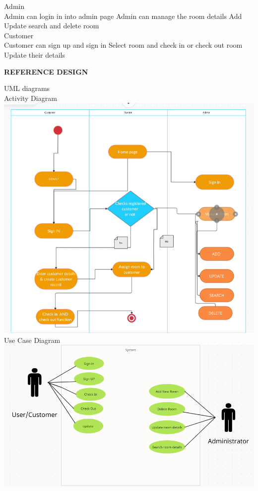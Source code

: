 \documentclass[a4paper,12pt]{report}
\begin{document}
Admin \\
Admin can login in into admin page 
Admin can manage the room details
Add Update search and delete room\\

     Customer\\
Customer can sign up and sign in
Select room and check in or check out room
Update their details
\begin{flushleft}
		\textbf{REFERENCE DESIGN} 
\end{flushleft} 
{UML diagrams}\\ 
Activity Diagram\\
\includegraphics[scale=0.5]{AD.png}
\newpage
Use Case Diagram\\
\includegraphics[scale=0.5]{UD.png}\\
\end{document}
